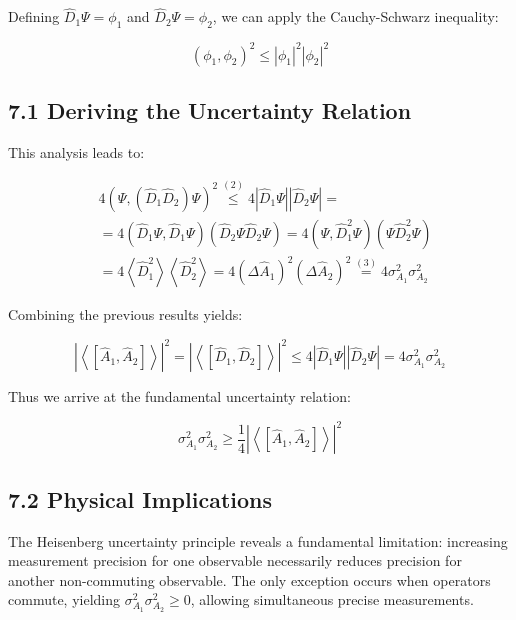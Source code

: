 \documentclass[10pt]{article}
\begin{document}
Defining $\hat{D}_{1} \Psi=\phi_{1}$ and $\hat{D}_{2} \Psi=\phi_{2}$, we can apply the Cauchy-Schwarz inequality:

\begin{equation*}
\left(\phi_{1}, \phi_{2}\right)^{2} \leq\left|\phi_{1}\right|^2\left|\phi_{2}\right|^2 \tag{7.14}
\end{equation*}


\subsection*{7.1 Deriving the Uncertainty Relation}
This analysis leads to:

\begin{align*}
& 4\left(\Psi,\left(\hat{D}_{1} \hat{D}_{2}\right) \Psi\right)^{2} \stackrel{(2)}{\leq} 4\left|\hat{D}_{1} \Psi\right|\left|\hat{D}_{2} \Psi\right|= \\
& =4\left(\hat{D}_{1} \Psi, \hat{D}_{1} \Psi\right)\left(\hat{D}_{2} \Psi \hat{D}_{2} \Psi\right)=4\left(\Psi, \hat{D}_{1}^{2} \Psi\right)\left(\Psi \hat{D}_{2}^{2} \Psi\right)  \tag{7.15}\\
& =4\left\langle\hat{D}_{1}^{2}\right\rangle\left\langle\hat{D}_{2}^{2}\right\rangle=4\left(\Delta \hat{A}_{1}\right)^{2}\left(\Delta \hat{A}_{2}\right)^{2} \stackrel{(3)}{=} 4 \sigma_{A_{1}}^{2} \sigma_{A_{2}}^{2}
\end{align*}

Combining the previous results yields:

\begin{equation*}
\left|\left\langle\left[\hat{A}_{1}, \hat{A}_{2}\right]\right\rangle\right|^{2}=\left|\left\langle\left[\hat{D}_{1}, \hat{D}_{2}\right]\right\rangle\right|^{2} \leq 4\left|\hat{D}_{1} \Psi\right|\left|\hat{D}_{2} \Psi\right|=4 \sigma_{A_{1}}^{2} \sigma_{A_{2}}^{2} \tag{7.16}
\end{equation*}

Thus we arrive at the fundamental uncertainty relation:

\begin{equation*}
\sigma_{A_{1}}^{2} \sigma_{A_{2}}^{2} \geq \frac{1}{4}\left|\left\langle\left[\hat{A}_{1}, \hat{A}_{2}\right]\right\rangle\right|^{2} \tag{7.17}
\end{equation*}

\subsection*{7.2 Physical Implications}
The Heisenberg uncertainty principle reveals a fundamental limitation: increasing measurement precision for one observable necessarily reduces precision for another non-commuting observable. The only exception occurs when operators commute, yielding $\sigma_{A_{1}}^{2} \sigma_{A_{2}}^{2} \geq 0$, allowing simultaneous precise measurements.
\end{document}
